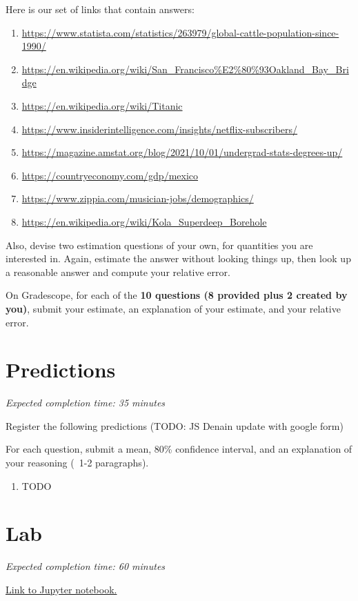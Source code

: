 \documentclass[11pt]{article}
\begin{document}
Here is our set of links that contain answers:
\begin{enumerate}
\item \url{https://www.statista.com/statistics/263979/global-cattle-population-since-1990/}
\item \url{https://en.wikipedia.org/wiki/San_Francisco%E2%80%93Oakland_Bay_Bridge}
\item \url{https://en.wikipedia.org/wiki/Titanic}
\item \url{https://www.insiderintelligence.com/insights/netflix-subscribers/}
\item \url{https://magazine.amstat.org/blog/2021/10/01/undergrad-stats-degrees-up/}
\item \url{https://countryeconomy.com/gdp/mexico}
\item \url{https://www.zippia.com/musician-jobs/demographics/}
\item \url{https://en.wikipedia.org/wiki/Kola_Superdeep_Borehole}
\end{enumerate}

Also, devise two estimation questions of your own, for quantities you are interested in. Again, estimate the answer without looking things up, then look up a reasonable answer and compute your relative error.

On Gradescope, for each of the \textbf{10 questions (8 provided plus 2 created by you)}, submit your estimate, an explanation of your estimate, and your relative error.

\section*{Predictions}

\emph{Expected completion time: 35 minutes}

Register the following predictions (TODO: JS Denain update with google form)



For each question, submit a mean, 80\% confidence interval, and an explanation of your reasoning (~1-2 paragraphs).

\begin{enumerate}
	\item TODO
\end{enumerate}

\section*{Lab}

\emph{Expected completion time: 60 minutes}

\href{https://datahub.berkeley.edu/hub/user-redirect/git-pull?repo=https%3A%2F%2Fgithub.com%2Fjs-d%2Fstat-157-260-website&urlpath=tree%2Fstat-157-260-website%2Fhw%2Fhw2%2Fhw2_lab.ipynb&branch=main}{Link to Jupyter notebook.}
\end{document}
